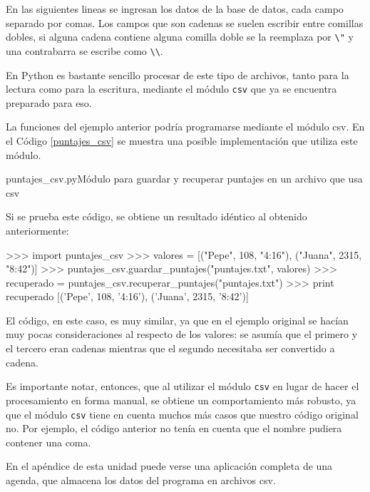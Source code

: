 En las siguientes lineas se ingresan los datos de la base de datos, cada
campo separado por comas. Los campos que son cadenas se suelen escribir
entre comillas dobles, si alguna cadena contiene alguna comilla doble se la
reemplaza por \verb!\"! y una contrabarra se escribe como \verb!\\!. 

En Python es bastante sencillo procesar de este tipo de archivos, tanto
para la lectura como para la escritura, mediante el módulo \verb!csv! que
ya se encuentra preparado para eso.

La funciones del ejemplo anterior podría programarse mediante el módulo
csv.  En el Código \ref{puntajes_csv} se muestra una posible implementación
que utiliza este módulo.

\begin{codigo}{puntajes\_csv.py}{Módulo para guardar y recuperar puntajes en un archivo que usa csv}
\label{puntajes_csv}

\end{codigo}

Si se prueba este código, se obtiene un resultado idéntico al obtenido
anteriormente:

\begin{codigo-python-sn}
>>> import puntajes_csv
>>> valores = [("Pepe", 108, "4:16"), ("Juana", 2315, "8:42")]
>>> puntajes_csv.guardar_puntajes("puntajes.txt", valores)
>>> recuperado = puntajes_csv.recuperar_puntajes("puntajes.txt")
>>> print recuperado
[('Pepe', 108, '4:16'), ('Juana', 2315, '8:42')]
\end{codigo-python-sn}

El código, en este caso, es muy similar, ya que en el ejemplo original se
hacían muy pocas consideraciones al respecto de los valores: se asumía que
el primero y el tercero eran cadenas mientras que el segundo necesitaba ser
convertido a cadena.

\begin{observacion}
Es importante notar, entonces, que al utilizar el módulo \lstinline!csv!
en lugar de hacer el procesamiento en forma manual, se obtiene un
comportamiento más robusto, ya que el módulo \lstinline!csv! tiene en
cuenta muchos más casos que nuestro código original no. Por ejemplo, el
código anterior no tenía en cuenta que el nombre pudiera contener una coma.
\end{observacion}

En el apéndice de esta unidad puede verse una aplicación completa de una
agenda, que almacena los datos del programa en archivos csv.

